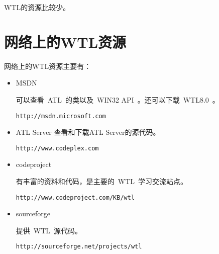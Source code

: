 ﻿%
%


WTL的资源比较少。

\section{网络上的WTL资源}

网络上的WTL资源主要有：

\begin{itemize}
    \item {MSDN}

可以查看~ATL~的类以及~WIN32 API~。还可以下载~WTL8.0~。
\begin{verbatim}
http://msdn.microsoft.com
\end{verbatim}

    \item {ATL Server}
查看和下载ATL Server的源代码。
\begin{verbatim}
http://www.codeplex.com
\end{verbatim}

    \item {codeproject}

有丰富的资料和代码，是主要的~WTL~学习交流站点。
\begin{verbatim}
http://www.codeproject.com/KB/wtl
\end{verbatim}

    \item {sourceforge}

提供~WTL~源代码。
\begin{verbatim}
http://sourceforge.net/projects/wtl
\end{verbatim}

\end{itemize}
